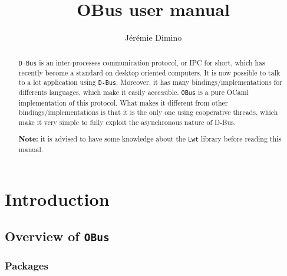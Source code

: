 \documentclass{article}
\title{OBus user manual}
\author{Jérémie Dimino}
\newcommand{\obus}{\texttt{OBus}\xspace}
\newcommand{\dbus}{\texttt{D-Bus}\xspace}
\begin{document}
\maketitle


\begin{abstract}

  \dbus is an inter-processes communication protocol, or IPC for
  short, which has recently become a standard on desktop oriented
  computers. It is now possible to talk to a lot application using
  \dbus. Moreover, it has many bindings/implementations for differents
  languages, which make it easily accessible. \obus is a pure OCaml
  implementation of this protocol. What makes it different from other
  bindings/implementations is that it is the only one using
  cooperative threads, which make it very simple to fully exploit the
  asynchronous nature of D-Bus.

  \textbf{Note:} it is advised to have some knowledge about the
  \texttt{Lwt} library before reading this manual.
\end{abstract}


\setcounter{tocdepth}{2}
\tableofcontents

\section{Introduction}

\subsection{Overview of \obus}

\subsubsection{Packages}
\end{document}
